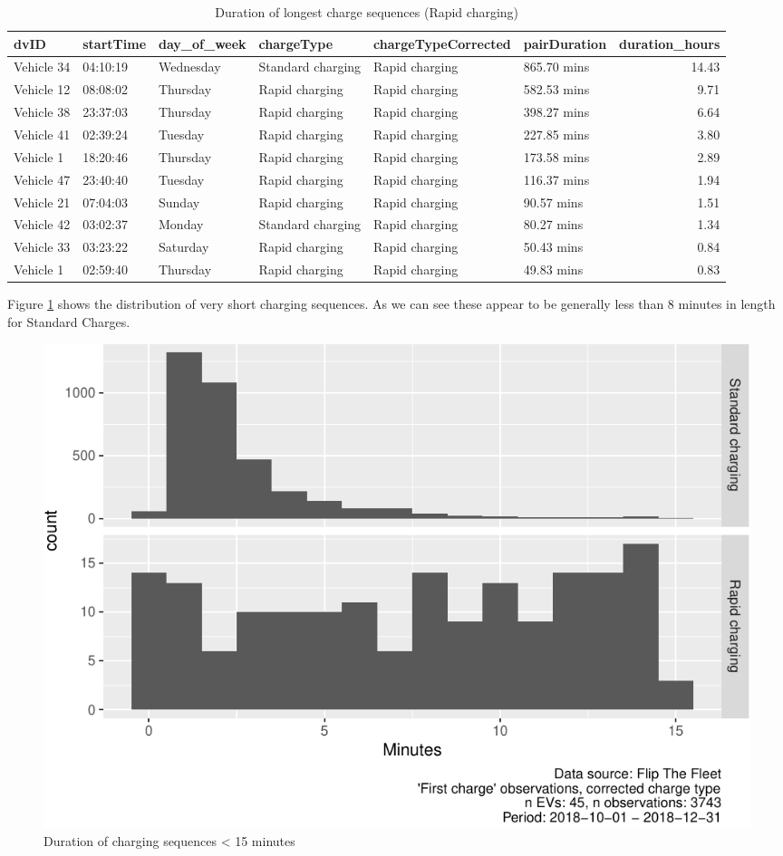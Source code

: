 \documentclass[]{article}
\begin{document}
\begin{table}[t]

\caption{\label{tab:durationLongTableRapid}Duration of longest charge sequences (Rapid charging)}
\centering
\begin{tabular}{l|l|l|l|l|l|r}
\hline
dvID & startTime & day\_of\_week & chargeType & chargeTypeCorrected & pairDuration & duration\_hours\\
\hline
Vehicle 34 & 04:10:19 & Wednesday & Standard charging & Rapid charging & 865.70 mins & 14.43\\
\hline
Vehicle 12 & 08:08:02 & Thursday & Rapid charging & Rapid charging & 582.53 mins & 9.71\\
\hline
Vehicle 38 & 23:37:03 & Thursday & Rapid charging & Rapid charging & 398.27 mins & 6.64\\
\hline
Vehicle 41 & 02:39:24 & Tuesday & Rapid charging & Rapid charging & 227.85 mins & 3.80\\
\hline
Vehicle 1 & 18:20:46 & Thursday & Rapid charging & Rapid charging & 173.58 mins & 2.89\\
\hline
Vehicle 47 & 23:40:40 & Tuesday & Rapid charging & Rapid charging & 116.37 mins & 1.94\\
\hline
Vehicle 21 & 07:04:03 & Sunday & Rapid charging & Rapid charging & 90.57 mins & 1.51\\
\hline
Vehicle 42 & 03:02:37 & Monday & Standard charging & Rapid charging & 80.27 mins & 1.34\\
\hline
Vehicle 33 & 03:23:22 & Saturday & Rapid charging & Rapid charging & 50.43 mins & 0.84\\
\hline
Vehicle 1 & 02:59:40 & Thursday & Rapid charging & Rapid charging & 49.83 mins & 0.83\\
\hline
\end{tabular}
\end{table}

Figure \ref{fig:shortDuration} shows the distribution of very short charging sequences. As we can see these appear to be generally less than 8 minutes in length for Standard Charges.

\begin{figure}
\centering
\includegraphics{EVBB_report_v1_files/figure-latex/shortDuration-1.pdf}
\caption{\label{fig:shortDuration}Duration of charging sequences \textless{} 15 minutes}
\end{figure}
\end{document}
